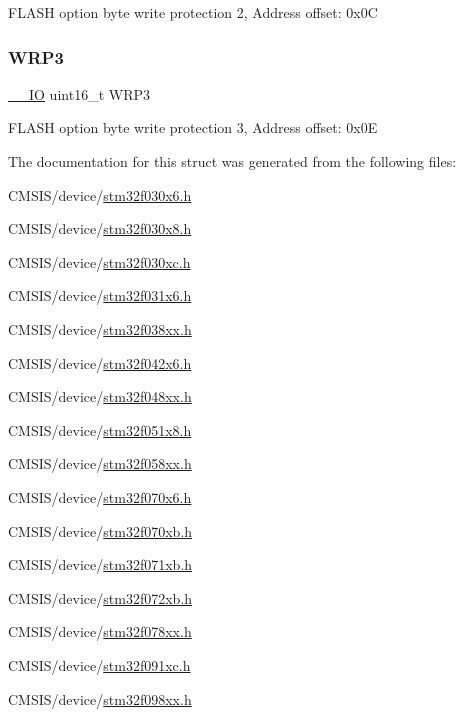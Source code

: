 F\+L\+A\+SH option byte write protection 2, Address offset\+: 0x0C \mbox{\label{struct_o_b___type_def_a7d9c1634a4c6027e12345f25d9d15b4d}} 
\subsubsection{\texorpdfstring{W\+R\+P3}{WRP3}}
{\footnotesize\ttfamily \hyperlink{core__sc300_8h_aec43007d9998a0a0e01faede4133d6be}{\+\_\+\+\_\+\+IO} uint16\+\_\+t W\+R\+P3}

F\+L\+A\+SH option byte write protection 3, Address offset\+: 0x0E 

The documentation for this struct was generated from the following files\+:\begin{DoxyCompactItemize}
\item 
C\+M\+S\+I\+S/device/\hyperlink{stm32f030x6_8h}{stm32f030x6.\+h}\item 
C\+M\+S\+I\+S/device/\hyperlink{stm32f030x8_8h}{stm32f030x8.\+h}\item 
C\+M\+S\+I\+S/device/\hyperlink{stm32f030xc_8h}{stm32f030xc.\+h}\item 
C\+M\+S\+I\+S/device/\hyperlink{stm32f031x6_8h}{stm32f031x6.\+h}\item 
C\+M\+S\+I\+S/device/\hyperlink{stm32f038xx_8h}{stm32f038xx.\+h}\item 
C\+M\+S\+I\+S/device/\hyperlink{stm32f042x6_8h}{stm32f042x6.\+h}\item 
C\+M\+S\+I\+S/device/\hyperlink{stm32f048xx_8h}{stm32f048xx.\+h}\item 
C\+M\+S\+I\+S/device/\hyperlink{stm32f051x8_8h}{stm32f051x8.\+h}\item 
C\+M\+S\+I\+S/device/\hyperlink{stm32f058xx_8h}{stm32f058xx.\+h}\item 
C\+M\+S\+I\+S/device/\hyperlink{stm32f070x6_8h}{stm32f070x6.\+h}\item 
C\+M\+S\+I\+S/device/\hyperlink{stm32f070xb_8h}{stm32f070xb.\+h}\item 
C\+M\+S\+I\+S/device/\hyperlink{stm32f071xb_8h}{stm32f071xb.\+h}\item 
C\+M\+S\+I\+S/device/\hyperlink{stm32f072xb_8h}{stm32f072xb.\+h}\item 
C\+M\+S\+I\+S/device/\hyperlink{stm32f078xx_8h}{stm32f078xx.\+h}\item 
C\+M\+S\+I\+S/device/\hyperlink{stm32f091xc_8h}{stm32f091xc.\+h}\item 
C\+M\+S\+I\+S/device/\hyperlink{stm32f098xx_8h}{stm32f098xx.\+h}\end{DoxyCompactItemize}
